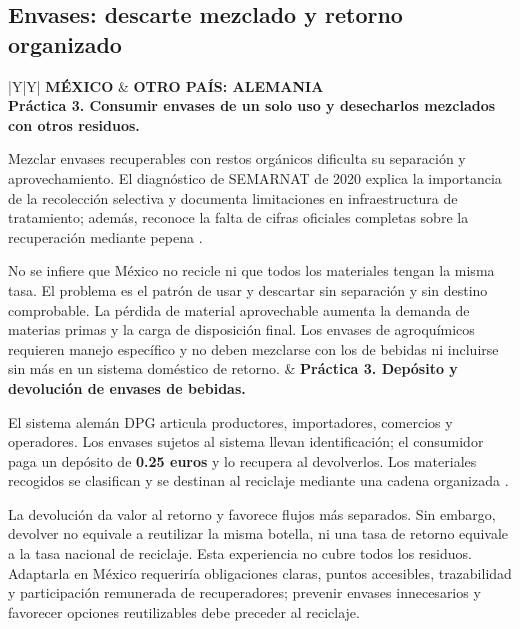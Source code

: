 \begin{landscape}
\clearpage
\subsection{Envases: descarte mezclado y retorno organizado}
\begin{tabularx}{\linewidth}{|Y|Y|}
\hline
{}\textbf{MÉXICO} & \textbf{OTRO PAÍS: ALEMANIA}\\
\hline
\textbf{Práctica 3. Consumir envases de un solo uso y desecharlos mezclados con otros residuos.}
\par Mezclar envases recuperables con restos orgánicos dificulta su separación y aprovechamiento. El diagnóstico de SEMARNAT de 2020 explica la importancia de la recolección selectiva y documenta limitaciones en infraestructura de tratamiento; además, reconoce la falta de cifras oficiales completas sobre la recuperación mediante pepena \parencite[secs. 2.2.1.3 y 2.2.3.2]{semarnat2020}.
\par No se infiere que México no recicle ni que todos los materiales tengan la misma tasa. El problema es el patrón de usar y descartar sin separación y sin destino comprobable. La pérdida de material aprovechable aumenta la demanda de materias primas y la carga de disposición final. Los envases de agroquímicos requieren manejo específico y no deben mezclarse con los de bebidas ni incluirse sin más en un sistema doméstico de retorno.
&
\textbf{Práctica 3. Depósito y devolución de envases de bebidas.}
\par El sistema alemán DPG articula productores, importadores, comercios y operadores. Los envases sujetos al sistema llevan identificación; el consumidor paga un depósito de \textbf{0.25 euros} y lo recupera al devolverlos. Los materiales recogidos se clasifican y se destinan al reciclaje mediante una cadena organizada \parencite{dpgProceso}.
\par La devolución da valor al retorno y favorece flujos más separados. Sin embargo, devolver no equivale a reutilizar la misma botella, ni una tasa de retorno equivale a la tasa nacional de reciclaje. Esta experiencia no cubre todos los residuos. Adaptarla en México requeriría obligaciones claras, puntos accesibles, trazabilidad y participación remunerada de recuperadores; prevenir envases innecesarios y favorecer opciones reutilizables debe preceder al reciclaje.
\\\hline
{}\\
\hline
\end{tabularx}
\end{landscape}

